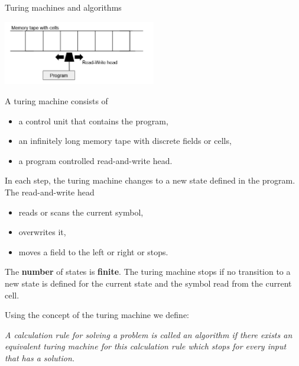 \begin{vbframe}{Turing machines and algorithms}

\begin{center}
\includegraphics[width=0.5\textwidth]{figure_man/turingmachine.png}
\end{center}

A turing machine consists of

\begin{itemize}
\item a control unit that contains the program,
\item an infinitely long memory tape with discrete fields or cells,
\item a program controlled read-and-write head.
\end{itemize}


\framebreak

In each step, the turing machine changes to a new state defined in the program. The read-and-write head

\begin{itemize}
\item reads or scans the current symbol,
\item overwrites it,
\item moves a field to the left or right or stops.
\end{itemize}

The \textbf{number} of states is \textbf{finite}. The turing machine stops if no transition to a new state is defined for the current state and the symbol read from the current cell.


\framebreak

Using the concept of the turing machine we define:

\begin{center}
\begin{minipage}{0.9\textwidth}
\emph{A calculation rule for solving a problem is called an algorithm if there exists an equivalent turing machine for this calculation rule which stops for every input that has a solution.} \\
\end{minipage}
\end{center}


\end{vbframe}
